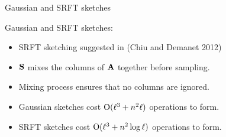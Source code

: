 \documentclass[xcolor=x11names,compress,ignorenonframetext]{beamer}
\renewcommand{\(}{\begin{columns}}
\renewcommand{\)}{\end{columns}}
\newcommand{\<}[1]{\begin{column}{#1}}
\renewcommand{\>}{\end{column}}
\def\refcolor{DodgerBlue4}
\newcommand{\refer}[1]{({\color{\refcolor}#1})}
\begin{document}
\begin{frame}{Gaussian and SRFT sketches }
 
  Gaussian and SRFT sketches:
 \begin{itemize}
   \item SRFT sketching suggested in \refer{Chiu and Demanet 2012}
   \item $\mathbf{S}$ mixes the columns of $\mathbf{A}$ together before sampling.
   \item Mixing process ensures that no columns are ignored.
   \item Gaussian sketches cost $\mathrm{O}(\ell^3 + n^2 \ell)$ operations to form.
   \item SRFT sketches cost $\mathrm{O}(\ell^3 + n^2 \log \ell)$ operations to form.
   
\end{itemize}
 
\end{frame}



% 
\end{document}
